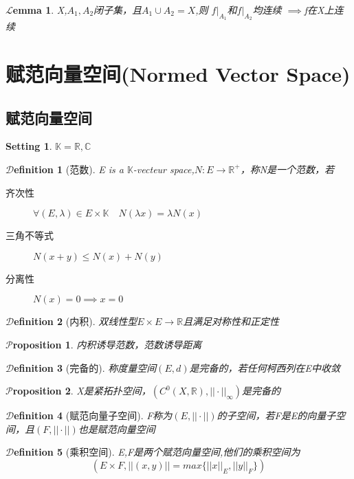 \documentclass[hyperfer,UTF8,a4paper,12pt]{article}
\theoremstyle{plain}
\newtheorem*{Lem}{$\mathcal{L}$emma}
\newtheorem*{Prop}{$\mathcal{P}$roposition}
\newtheorem{Def}{{$\mathcal{D}$efinition}}[section]
\newtheorem*{Setting}{{Setting}}
\begin{document}
\begin{Lem}
	X,$ A_1,A_2$闭子集，且$ A_1\cup A_2=X $,则
	$ f|_{A_1} $和$ f|_{A_2} $均连续
	$\implies $f在X上连续
\end{Lem}

\section{赋范向量空间(Normed Vector Space)}
\subsection{赋范向量空间}
\begin{Setting}
	$ \mathbb{K}=\mathbb{R},\mathbb{C} $
\end{Setting}
\begin{Def}[范数]
	E is a $ \mathbb{K} $-vecteur space,$ N:E\to\mathbb{R}^+ $，称N是一个范数，若
	\begin{description}
		\item[齐次性]  $ \forall (E,\lambda)\in E\times\mathbb{K}\quad N(\lambda x)=\lambda N(x) $
		\item[三角不等式]$ N(x+y)\leq N(x)+N(y) $
		\item[分离性] $ N(x)=0\implies x=0 $
	\end{description}
\end{Def}

\begin{Def}[内积]
	双线性型$ E\times E\to\mathbb{R} $且满足对称性和正定性
\end{Def}
\begin{Prop}
	内积诱导范数，范数诱导距离
\end{Prop}

\begin{Def}[完备的]
	称度量空间$ (E,d) $是完备的，若任何柯西列在E中收敛
\end{Def}

\begin{Prop}
	X是紧拓扑空间，$ (C^0(X,\mathbb{R}),||\cdot||_\infty) $是完备的
\end{Prop}

\begin{Def}[赋范向量子空间]
	F称为$ (E,||\cdot||) $的子空间，若F是E的向量子空间，且$ (F,||\cdot||) $也是赋范向量空间
\end{Def}

\begin{Def}[乘积空间]
	E,F是两个赋范向量空间,他们的乘积空间为\[ (E\times F,||(x,y)||=max\{||x||_E,||y||_F \}) \]
\end{Def}
\end{document}
